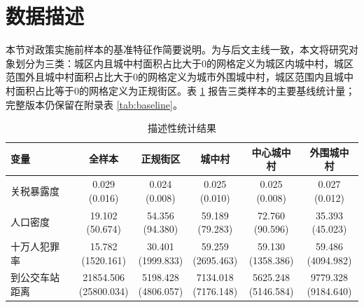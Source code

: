 \documentclass[a4paper,12pt]{report}
\begin{document}
\section{数据描述}
本节对政策实施前样本的基准特征作简要说明。为与后文主线一致，本文将研究对象划分为三类：城区内且城中村面积占比大于0的网格定义为城区内城中村，城区范围外且城中村面积占比大于0的网格定义为城市外围城中村，城区范围内且城中村面积占比等于0的网格定义为正规街区。表 \ref{tab:baseline_main} 报告三类样本的主要基线统计量；完整版本仍保留在附录表 \ref{tab:baseline}。

\begin{table}[H]
\centering
\caption{描述性统计结果}
\label{tab:baseline_main}
\begin{adjustbox}{width=\textwidth,center}
\begin{tabular}{lccccc}
\toprule
变量 & 全样本 & 正规街区 & 城中村 & 中心城中村 & 外围城中村 \\
\midrule
关税暴露度 & \makecell{0.029\\(0.016)} & \makecell{0.024\\(0.008)} & \makecell{0.025\\(0.010)} & \makecell{0.025\\(0.008)} & \makecell{0.027\\(0.012)} \\
人口密度 & \makecell{19.102\\(50.674)} & \makecell{54.356\\(94.380)} & \makecell{59.189\\(79.283)} & \makecell{72.760\\(90.596)} & \makecell{35.393\\(45.023)} \\
十万人犯罪率 & \makecell{15.782\\(1520.161)} & \makecell{30.401\\(1999.833)} & \makecell{59.259\\(2695.463)} & \makecell{59.130\\(1358.386)} & \makecell{59.486\\(4094.982)} \\
到公交车站距离 & \makecell{21854.506\\(25800.034)} & \makecell{5198.428\\(4806.057)} & \makecell{7134.018\\(7176.148)} & \makecell{5625.248\\(5146.584)} & \makecell{9779.328\\(9184.640)} \\

\end{tabular}
\end{adjustbox}
\end{table}
\end{document}

